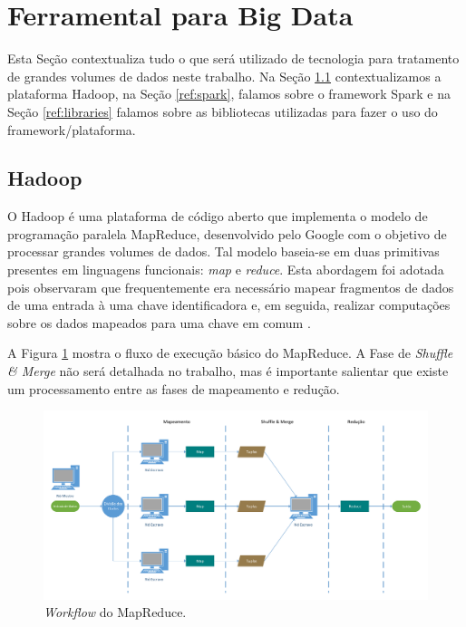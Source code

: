 \section{Ferramental para Big Data}

Esta Seção contextualiza tudo o que será utilizado de tecnologia para 
tratamento de grandes volumes de dados neste trabalho. Na Seção 
\ref{ref:hadoop} contextualizamos a plataforma Hadoop, na Seção 
\ref{ref:spark}, falamos sobre o framework Spark e na Seção \ref{ref:libraries} 
falamos sobre as bibliotecas utilizadas para fazer o uso do 
framework/plataforma. 

\subsection{Hadoop} \label{ref:hadoop}

O Hadoop é uma plataforma de código aberto que implementa o modelo de 
programação paralela MapReduce, desenvolvido pelo Google com o objetivo de 
processar grandes volumes de dados. Tal modelo baseia-se em duas primitivas 
presentes em linguagens funcionais: \emph{map} e \emph{reduce}. Esta abordagem 
foi adotada pois observaram que frequentemente era necessário mapear fragmentos 
de dados de uma entrada à uma chave identificadora e, em seguida, realizar 
computações sobre os dados mapeados para uma chave em comum 
\cite{ref:mapreduce}.

A Figura \ref{fig:mrworkflow} mostra o fluxo de execução básico do MapReduce. 
A Fase de \emph{Shuffle \& Merge} não será detalhada no trabalho, mas é 
importante salientar que existe um processamento entre as fases de mapeamento e 
redução.

\begin{figure}[ht]
 \centerline{\includegraphics[width=1\textwidth]{./img/mapreduce-workflow.pdf}}
 \caption{\emph{Workflow} do MapReduce.}
 \label{fig:mrworkflow}
\end{figure}

